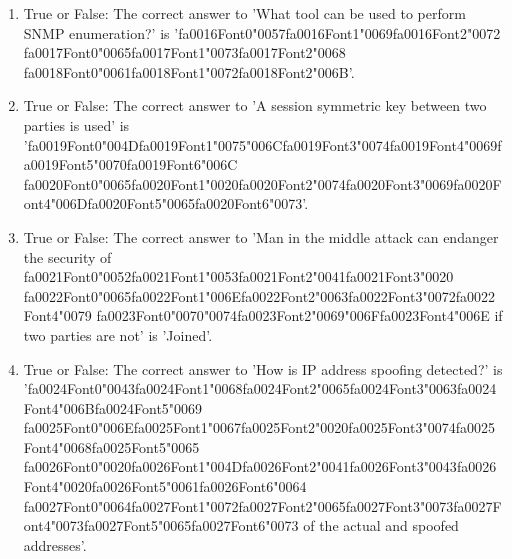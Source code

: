 \documentclass[12pt]{article}
\begin{document}
\begin{enumerate}[label=\arabic*.]
\item True or False: The correct answer to 'What tool can be used to perform SNMP enumeration?' is '{\csname fa0016Font0\endcsname\char"0057}{\csname fa0016Font1\endcsname\char"0069}{\csname fa0016Font2\endcsname\char"0072} {\csname fa0017Font0\endcsname\char"0065}{\csname fa0017Font1\endcsname\char"0073}{\csname fa0017Font2\endcsname\char"0068} {\csname fa0018Font0\endcsname\char"0061}{\csname fa0018Font1\endcsname\char"0072}{\csname fa0018Font2\endcsname\char"006B}'.
\item True or False: The correct answer to 'A session symmetric key between two parties is used' is '{\csname fa0019Font0\endcsname\char"004D}{\csname fa0019Font1\endcsname\char"0075}{\char"006C}{\csname fa0019Font3\endcsname\char"0074}{\csname fa0019Font4\endcsname\char"0069}{\csname fa0019Font5\endcsname\char"0070}{\csname fa0019Font6\endcsname\char"006C} {\csname fa0020Font0\endcsname\char"0065}{\csname fa0020Font1\endcsname\char"0020}{\csname fa0020Font2\endcsname\char"0074}{\csname fa0020Font3\endcsname\char"0069}{\csname fa0020Font4\endcsname\char"006D}{\csname fa0020Font5\endcsname\char"0065}{\csname fa0020Font6\endcsname\char"0073}'.
\item True or False: The correct answer to 'Man in the middle attack can endanger the security of {\csname fa0021Font0\endcsname\char"0052}{\csname fa0021Font1\endcsname\char"0053}{\csname fa0021Font2\endcsname\char"0041}{\csname fa0021Font3\endcsname\char"0020} {\csname fa0022Font0\endcsname\char"0065}{\csname fa0022Font1\endcsname\char"006E}{\csname fa0022Font2\endcsname\char"0063}{\csname fa0022Font3\endcsname\char"0072}{\csname fa0022Font4\endcsname\char"0079} {\csname fa0023Font0\endcsname\char"0070}{\char"0074}{\csname fa0023Font2\endcsname\char"0069}{\char"006F}{\csname fa0023Font4\endcsname\char"006E} if two parties are not' is 'Joined'.
\item True or False: The correct answer to 'How is IP address spoofing detected?' is '{\csname fa0024Font0\endcsname\char"0043}{\csname fa0024Font1\endcsname\char"0068}{\csname fa0024Font2\endcsname\char"0065}{\csname fa0024Font3\endcsname\char"0063}{\csname fa0024Font4\endcsname\char"006B}{\csname fa0024Font5\endcsname\char"0069} {\csname fa0025Font0\endcsname\char"006E}{\csname fa0025Font1\endcsname\char"0067}{\csname fa0025Font2\endcsname\char"0020}{\csname fa0025Font3\endcsname\char"0074}{\csname fa0025Font4\endcsname\char"0068}{\csname fa0025Font5\endcsname\char"0065} {\csname fa0026Font0\endcsname\char"0020}{\csname fa0026Font1\endcsname\char"004D}{\csname fa0026Font2\endcsname\char"0041}{\csname fa0026Font3\endcsname\char"0043}{\csname fa0026Font4\endcsname\char"0020}{\csname fa0026Font5\endcsname\char"0061}{\csname fa0026Font6\endcsname\char"0064} {\csname fa0027Font0\endcsname\char"0064}{\csname fa0027Font1\endcsname\char"0072}{\csname fa0027Font2\endcsname\char"0065}{\csname fa0027Font3\endcsname\char"0073}{\csname fa0027Font4\endcsname\char"0073}{\csname fa0027Font5\endcsname\char"0065}{\csname fa0027Font6\endcsname\char"0073} of the actual and spoofed addresses'.

\end{enumerate}
\end{document}

